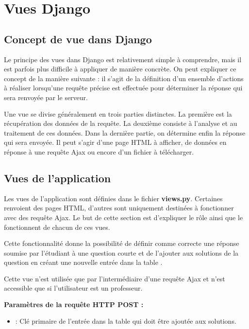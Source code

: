 \documentclass[a4paper,11pt,openany,oneside]{sphinxmanual}
\begin{document}
\chapter{Vues Django}
\label{source::doc}\label{source:vues-django}

\section{Concept de vue dans Django}
\label{source:concept-de-vue-dans-django}
Le principe des vues dans Django est relativement simple à comprendre, mais il est parfois
plus difficile à appliquer de manière concrète. On peut expliquer ce concept de
la manière suivante : il s'agit de la définition d'un ensemble d'actions à réaliser
lorsqu'une requête précise est effectuée pour déterminer la réponse qui sera renvoyée
par le serveur.

Une vue se divise généralement en trois parties distinctes.
La première est la récupération des données de la requête. La deuxième consiste
à l'analyse et au traitement de ces données. Dans la dernière partie, on détermine
enfin la réponse qui sera envoyée. Il peut s'agir d'une page HTML à afficher, de
données en réponse à une requête Ajax ou encore d'un fichier à télécharger.


\section{Vues de l'application}
\label{source:vues-de-l-application}
Les vues de l'application sont définies dans le fichier \textbf{views.py}. Certaines renvoient
des pages HTML, d'autres sont uniquement destinées à fonctionner avec des requête Ajax.
Le but de cette section est d'expliquer le rôle ainsi que le fonctionnent de chacun de ces vues.
\label{source:module-quiz.views}

\begin{fulllineitems}
\label{source:quiz.views.add_correct_answer}
Cette fonctionnalité donne la possibilité de définir comme correcte une réponse
soumise par l'étudiant à une question courte et de l'ajouter aux solutions de
la question en créant une nouvelle entrée dans la table .

Cette vue n'est utilisée que par l'intermédiaire d'une requête Ajax et n'est
accessible que si l'utilisateur est un professeur.

\textbf{Paramètres de la requête HTTP POST :}
\begin{itemize}
\item {} 
 : Clé primaire de l'entrée dans la table  qui doit être ajoutée aux solutions.

\end{itemize}

\end{fulllineitems}
\end{document}
